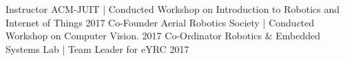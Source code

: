 \begin{cvhonors}
\cvhonor
    {Instructor}
    {ACM-JUIT | Conducted Workshop on Introduction to Robotics and Internet of Things}
    {}
    {2017}
  \cvhonor
    {Co-Founder}
    {Aerial Robotics Society | Conducted Workshop on Computer Vision.}
    {}
    {2017}
  \cvhonor
    {Co-Ordinator}
    {Robotics \& Embedded Systems Lab | Team Leader for eYRC}
    {}
    {2017}
 
\end{cvhonors}
